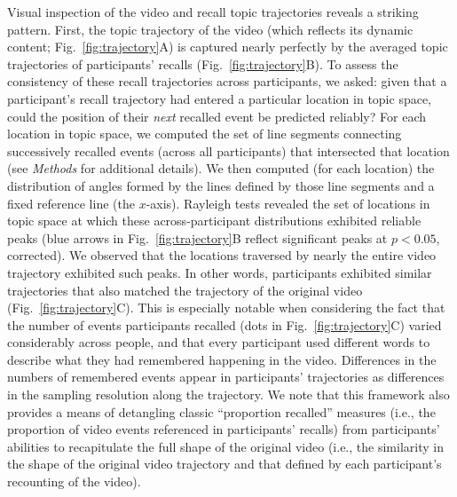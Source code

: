 \documentclass{article}
\begin{document}
Visual inspection of the video and recall topic trajectories reveals a striking pattern.  First, the topic trajectory of the video (which reflects its dynamic content; Fig.~\ref{fig:trajectory}A) is captured nearly perfectly by the averaged topic trajectories of participants' recalls (Fig.~\ref{fig:trajectory}B).  To assess the consistency of these recall trajectories across participants, we asked: given that a participant's recall trajectory had entered a particular location in topic space, could the position of their \textit{next} recalled event be predicted reliably?  For each location in topic space, we computed the set of line segments connecting successively recalled events (across all participants) that intersected that location (see \textit{Methods} for additional details).  We then computed (for each location) the distribution of angles formed by the lines defined by those line segments and a fixed reference line (the $x$-axis).  Rayleigh tests revealed the set of locations in topic space at which these across-participant distributions exhibited reliable peaks (blue arrows in Fig.~\ref{fig:trajectory}B reflect significant peaks at $p < 0.05$, corrected).  We observed that the locations traversed by nearly the entire video trajectory exhibited such peaks.  In other words, participants exhibited similar trajectories that also matched the trajectory of the original video (Fig.~\ref{fig:trajectory}C).  This is especially notable when considering the fact that the number of events participants recalled (dots in Fig.~\ref{fig:trajectory}C) varied considerably across people, and that every participant used different words to describe what they had remembered happening in the video.  Differences in the numbers of remembered events appear in participants' trajectories as differences in the sampling resolution along the trajectory.  We note that this framework also provides a means of detangling classic ``proportion recalled'' measures (i.e., the proportion of video events referenced in participants' recalls) from participants' abilities to recapitulate the full shape of the original video (i.e., the similarity in the shape of the original video trajectory and that defined by each participant's recounting of the video).
\end{document}
